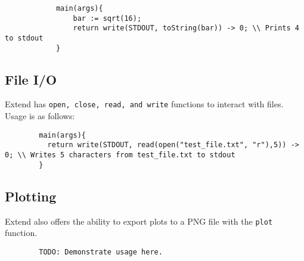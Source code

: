		\begin{lstlisting}
			main(args){
				bar := sqrt(16);
				return write(STDOUT, toString(bar)) -> 0; \\ Prints 4 to stdout
			}
		\end{lstlisting}

	\subsection{File I/O}
	Extend has \texttt{open, close, read, and write} functions to interact with files. Usage is as follows:

	\begin{lstlisting}
		main(args){
		  return write(STDOUT, read(open("test_file.txt", "r"),5)) -> 0; \\ Writes 5 characters from test_file.txt to stdout
		}
	\end{lstlisting}

	\subsection{Plotting}
	Extend also offers the ability to export plots to a PNG file with the \texttt{plot} function.

	\begin{lstlisting}
		TODO: Demonstrate usage here.
	\end{lstlisting}
